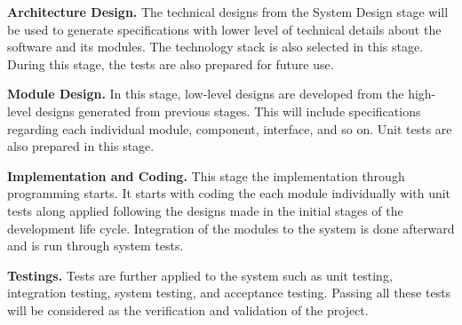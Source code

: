 \parx
\textbf{Architecture Design.}
\justifying
The technical designs from the System Design stage will be used to generate
specifications with lower level of technical details about the software and its
modules. The technology stack is also selected in this stage. During this stage,
the tests are also prepared for future use.

\parx
\textbf{Module Design.}
\justifying
In this stage, low-level designs are developed from the high-level designs
generated from previous stages. This will include specifications regarding each
individual module, component, interface, and so on. Unit tests are also prepared
in this stage.

\parx
\textbf{Implementation and Coding.}
\justifying
This stage the implementation through programming starts. It starts with coding
the each module individually with unit tests along applied following the designs
made in the initial stages of the development life cycle. Integration of the
modules to the system is done afterward and is run through system tests.

\parx
\textbf{Testings.}
\justifying
Tests are further applied to the system such as unit testing, integration
testing, system testing, and acceptance testing. Passing all these tests will be
considered as the verification and validation of the project.

